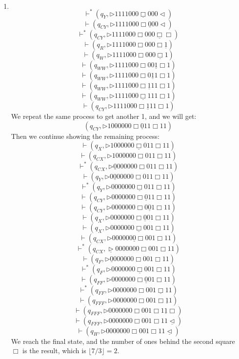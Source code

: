 \documentclass[12pt,a4paper]{article}
\makeatletter
\newtheorem*{solution}{Solution}
\theoremstyle{definition}
\renewenvironment{solution}[1][Solution] {\par\pushQED{\qed}\normalfont\topsep6\p@\@plus6\p@\relax\trivlist\item[\hskip\labelsep\bfseries#1\@addpunct{.}]\ignorespaces}{\popQED\endtrivlist\@endpefalse} \makeatother
\makeatother
\begin{document}
\begin{enumerate}
\begin{enumerate}
\begin{solution}
$$	$$
	$$
	\vdash^*(q_{Y},\triangleright  1  1  1  1  0  0  0  \underline{\Box} 0  0  0   \triangleleft)
	$$
	$$
	\vdash(q_{CY},\triangleright  1  1  1  1  0  0  0  \Box \underline{0}  0  0   \triangleleft)
	$$
	$$
	\vdash^*(q_{CY},\triangleright  1  1  1  1  0  0  0  \Box 0  0  0   \underline{\Box} \Box)
	$$
	$$
	\vdash(q_{R},\triangleright  1  1  1  1  0  0  0  \Box 0  0  0  \Box \underline{1})
	$$
	$$
	\vdash(q_{W},\triangleright  1  1  1  1  0  0  0  \Box 0  0  0  \underline{\Box} 1)
	$$
	$$
	\vdash(q_{WW},\triangleright  1  1  1  1  0  0  0  \Box 0  0  \underline{1}  \Box 1)
	$$
	$$
	\vdash(q_{WW},\triangleright  1  1  1  1  0  0  0  \Box 0  \underline{1}  1  \Box 1)
	$$
	$$
	\vdash(q_{WW},\triangleright  1  1  1  1  0  0  0  \Box \underline{1}  1  1  \Box 1)
	$$
	$$
	\vdash(q_{WW},\triangleright  1  1  1  1  0  0  0  \underline{\Box} 1  1  1  \Box 1)
	$$
	$$
	\vdash(q_{CY},\triangleright  1  1  1  1  0  0  0  \Box \underline{1} 1  1  \Box 1)
	$$
	 We repeat the same process to get another 1, and we will get:
	$$
    (q_{CY},\triangleright  1  0  0  0  0  0  0  \Box \underline{0}  1  1  \Box 1 1)
	$$
	Then we continue showing the remaining process:
	$$
    \vdash(q_{X},\triangleright  1  0  0  0  0  0  0  \underline{\Box} 0  1  1  \Box 1 1)
	$$
	$$
    \vdash(q_{CX},\triangleright  1  0  0  0  0  0  0  \Box 0  1  1  \Box 1 1)
	$$
	$$
    \vdash^*(q_{CX},\triangleright  \underline{0}  0  0  0  0  0  0  \Box 0  1  1  \Box 1 1)
	$$
	$$
    \vdash(q_{Y},\triangleright  0  \underline{0}  0  0  0  0  0  \Box 0  1  1  \Box 1 1)
	$$
	$$
    \vdash^*(q_{Y},\triangleright  0  0  0  0  0  0  0  \underline{\Box} 0  1  1  \Box 1 1)
	$$
	$$
    \vdash(q_{CY},\triangleright  0  0  0  0  0  0  0  \Box \underline{0}  1  1  \Box 1 1)
	$$
	$$
    \vdash(q_{CY},\triangleright  0  0  0  0  0  0  0  \Box 0  \underline{0}  1  \Box 1 1)
	$$
	$$
    \vdash(q_{X},\triangleright  0  0  0  0  0  0  0  \Box \underline{0}  0  1  \Box 1 1)
	$$
	$$
    \vdash(q_{X},\triangleright  0  0  0  0  0  0  0  \underline{\Box} 0  0  1  \Box 1 1)
	$$
	$$
    \vdash(q_{CX},\triangleright  0  0  0  0  0  0  \underline{0}  \Box 0  0  1  \Box 1 1)
	$$
	$$
    \vdash^*(q_{CX},\underline{\triangleright}  0  0  0  0  0  0  0  \Box 0  0  1  \Box 1 1)
	$$
	$$
    \vdash(q_{F},\triangleright  \underline{0}  0  0  0  0  0  0  \Box 0  0  1  \Box 1 1)
	$$
	$$
    \vdash^*(q_{F},\triangleright  0  0  0  0  0  0  0  \underline{\Box} 0  0  1  \Box 1 1)
	$$
	$$
    \vdash(q_{FF},\triangleright  0  0  0  0  0  0  0  \Box \underline{0}  0  1  \Box 1 1)
	$$
	$$
    \vdash^*(q_{FF},\triangleright  0  0  0  0  0  0  0  \Box 0  0  1 \underline{\Box} 1 1)
	$$
	$$
    \vdash(q_{FFF},\triangleright  0  0  0  0  0  0  0  \Box 0  0  1  \Box \underline{1} 1)
	$$
	$$
    \vdash(q_{FFF},\triangleright  0  0  0  0  0  0  0  \Box 0  0  1  \Box 1 \underline{1} \Box)
	$$
	$$
    \vdash(q_{FFF},\triangleright  0  0  0  0  0  0  0  \Box 0  0  1  \Box 1 1 \underline{\triangleleft})
	$$
	$$
    \vdash(q_{H},\triangleright  0  0  0  0  0  0  0  \Box 0  0  1  \Box 1 1 \underline{\triangleleft})
	$$
	We reach the final state, and the number of ones behind the second square $\Box$ is the result, which is $\lfloor 7/3\rfloor=2$.
	\end{solution}
	

\end{enumerate}
\end{enumerate}
\end{document}
